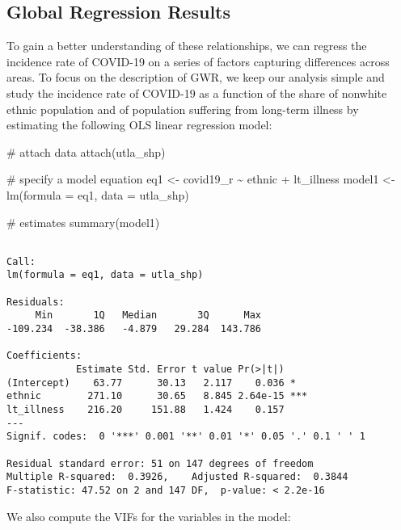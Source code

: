 \documentclass[
  letterpaper,
  krantz2]{style/krantz}
\newenvironment{Shaded}{\begin{snugshade}}{\end{snugshade}}
\newcommand{\AttributeTok}[1]{\textcolor[rgb]{0.40,0.45,0.13}{#1}}
\newcommand{\CommentTok}[1]{\textcolor[rgb]{0.37,0.37,0.37}{#1}}
\newcommand{\FunctionTok}[1]{\textcolor[rgb]{0.28,0.35,0.67}{#1}}
\newcommand{\NormalTok}[1]{\textcolor[rgb]{0.00,0.23,0.31}{#1}}
\newcommand{\OtherTok}[1]{\textcolor[rgb]{0.00,0.23,0.31}{#1}}
\newcommand{\SpecialCharTok}[1]{\textcolor[rgb]{0.37,0.37,0.37}{#1}}
\begin{document}
\hypertarget{global-regression-results}{%
\subsection{Global Regression Results}\label{global-regression-results}}

To gain a better understanding of these relationships, we can regress
the incidence rate of COVID-19 on a series of factors capturing
differences across areas. To focus on the description of GWR, we keep
our analysis simple and study the incidence rate of COVID-19 as a
function of the share of nonwhite ethnic population and of population
suffering from long-term illness by estimating the following OLS linear
regression model:

\begin{Shaded}
\begin{Highlighting}[]
\CommentTok{\# attach data}
\FunctionTok{attach}\NormalTok{(utla\_shp)}

\CommentTok{\# specify a model equation}
\NormalTok{eq1 }\OtherTok{\textless{}{-}}\NormalTok{ covid19\_r }\SpecialCharTok{\textasciitilde{}}\NormalTok{ ethnic }\SpecialCharTok{+}\NormalTok{ lt\_illness}
\NormalTok{model1 }\OtherTok{\textless{}{-}} \FunctionTok{lm}\NormalTok{(}\AttributeTok{formula =}\NormalTok{ eq1, }\AttributeTok{data =}\NormalTok{ utla\_shp)}

\CommentTok{\# estimates}
\FunctionTok{summary}\NormalTok{(model1)}
\end{Highlighting}
\end{Shaded}

\begin{verbatim}

Call:
lm(formula = eq1, data = utla_shp)

Residuals:
     Min       1Q   Median       3Q      Max 
-109.234  -38.386   -4.879   29.284  143.786 

Coefficients:
            Estimate Std. Error t value Pr(>|t|)    
(Intercept)    63.77      30.13   2.117    0.036 *  
ethnic        271.10      30.65   8.845 2.64e-15 ***
lt_illness    216.20     151.88   1.424    0.157    
---
Signif. codes:  0 '***' 0.001 '**' 0.01 '*' 0.05 '.' 0.1 ' ' 1

Residual standard error: 51 on 147 degrees of freedom
Multiple R-squared:  0.3926,    Adjusted R-squared:  0.3844 
F-statistic: 47.52 on 2 and 147 DF,  p-value: < 2.2e-16
\end{verbatim}

We also compute the VIFs for the variables in the model:
\end{document}

